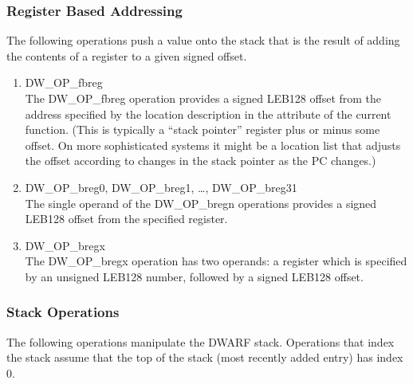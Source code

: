 \subsubsection{Register Based Addressing}
\label{chap:registerbasedaddressing}
The following operations push a value onto the stack that is
the result of adding the contents of a register to a given
signed offset.

\begin{enumerate}[1]

\item DW\-\_OP\-\_fbreg \\
The DW\-\_OP\-\_fbreg operation provides a signed LEB128 offset
from the address specified by the location description in the
 attribute of the current function. (This
is typically a “stack pointer” register plus or minus
some offset. On more sophisticated systems it might be a
location list that adjusts the offset according to changes
in the stack pointer as the PC changes.)

\item DW\-\_OP\-\_breg0, DW\-\_OP\-\_breg1, \dots, DW\-\_OP\-\_breg31\\
The single operand of the DW\-\_OP\-\_bregn operations provides
a signed LEB128 offset from
the specified register.

\item DW\-\_OP\-\_bregx \\
The DW\-\_OP\-\_bregx operation has two operands: a register
which is specified by an unsigned LEB128 number, followed by
a signed LEB128 offset.

\end{enumerate}


\subsubsection{Stack Operations}
\label{chap:stackoperations}
The following operations manipulate the DWARF stack. Operations
that index the stack assume that the top of the stack (most
recently added entry) has index 0.

